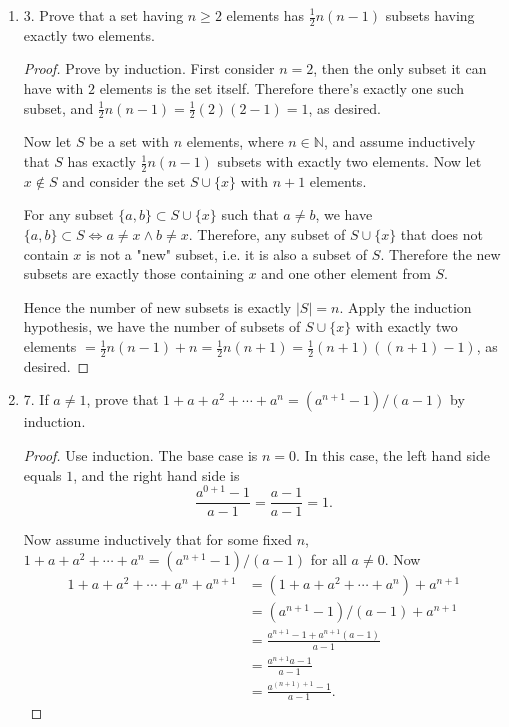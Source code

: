 \begin{enumerate}[resume]
	\item 3. Prove that a set having $n \geq 2$ elements has $\frac{1}{2} n(n-1)$ subsets having exactly two elements.
\begin{proof}
	Prove by induction. First consider $n = 2$, then the only subset it can have with $2$ elements is the set itself. Therefore there's exactly one such subset, and $\frac{1}{2}n(n-1) = \frac{1}{2}(2)(2-1) = 1$, as desired.

	Now let $S$ be a set with $n$ elements, where $n \in \mathbb{N}$, and assume inductively that $S$ has exactly $\frac{1}{2}n(n-1)$ subsets with exactly two elements. Now let $x \not\in S$ and consider the set $S \cup \{x\} $ with $n+1$ elements.

	For any subset $\{a,b\} \subset S \cup \{x\} $ such that $a \neq  b$, we have $\{a,b\} \subset S \iff a\neq x \land b\neq x$. Therefore, any subset of $S \cup \{x\} $ that does not contain $x$ is not a "new" subset, i.e. it is also a subset of $S$. Therefore the new subsets are exactly those containing $x$ and one other element from $S$.

	Hence the number of new subsets is exactly $|S| = n$. Apply the induction hypothesis, we have the number of subsets of $S \cup \{x\} $ with exactly two elements $= \frac{1}{2}n(n-1) + n = \frac{1}{2}n(n+1) = \frac{1}{2} (n+1)((n+1)-1)$, as desired.
\end{proof}

	\item 7. If $a \neq 1$, prove that $1+a+a^2+\cdots+a^n=\left(a^{n+1}-1\right) /(a-1)$ by induction.
\begin{proof}
	Use induction. The base case is $n = 0$. In this case, the left hand side equals  $1$, and the right hand side is \[
		\frac{a^{0+1}-1}{a-1} = \frac{a-1}{a - 1} = 1
	.\] 

	Now assume inductively that for some fixed $n$, $1+a+a^2+\cdots+a^n=\left(a^{n+1}-1\right) /(a-1)$ for all $a \neq  0$.  Now
	\begin{align*}
		1+a+a^2+\cdots+a^n + a^{n+1}
		&= (1+a+a^2+\cdots+a^n)+ a^{n+1} \\
		&= \left(a^{n+1}-1\right) /(a-1) + a^{n+1} \\
		&= \frac{a^{n+1} - 1 + a^{n+1}(a-1)}{a-1} \\
		&= \frac{a^{n+1}a -1}{a-1} \\
		&= \frac{a^{(n+1)+1} -1}{a-1}
	.\end{align*}
\end{proof}


\end{enumerate}
